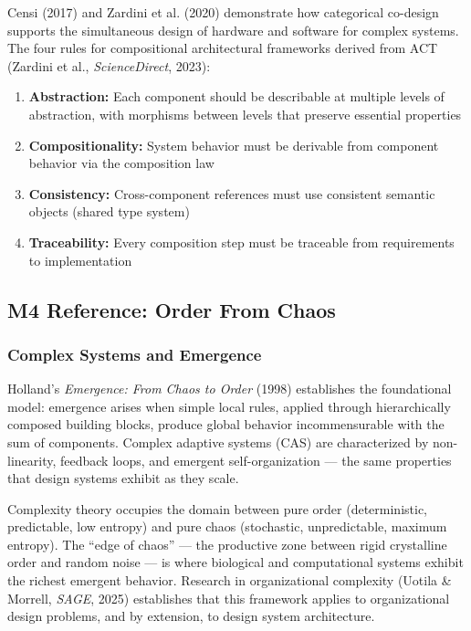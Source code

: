 \documentclass[11pt,letterpaper]{article}
\begin{document}
Censi (2017) and Zardini et al. (2020) demonstrate how categorical co-design supports the simultaneous design of hardware and software for complex systems. The four rules for compositional architectural frameworks derived from ACT (Zardini et al., \textit{ScienceDirect}, 2023):

\begin{enumerate}[leftmargin=2em, itemsep=0.3em]
  \item \textbf{Abstraction:} Each component should be describable at multiple levels of abstraction, with morphisms between levels that preserve essential properties
  \item \textbf{Compositionality:} System behavior must be derivable from component behavior via the composition law
  \item \textbf{Consistency:} Cross-component references must use consistent semantic objects (shared type system)
  \item \textbf{Traceability:} Every composition step must be traceable from requirements to implementation
\end{enumerate}

\subsection{M4 Reference: Order From Chaos}

\subsubsection{Complex Systems and Emergence}

Holland's \textit{Emergence: From Chaos to Order} (1998) establishes the foundational model: emergence arises when simple local rules, applied through hierarchically composed building blocks, produce global behavior incommensurable with the sum of components. Complex adaptive systems (CAS) are characterized by non-linearity, feedback loops, and emergent self-organization --- the same properties that design systems exhibit as they scale.

Complexity theory occupies the domain between pure order (deterministic, predictable, low entropy) and pure chaos (stochastic, unpredictable, maximum entropy). The ``edge of chaos'' --- the productive zone between rigid crystalline order and random noise --- is where biological and computational systems exhibit the richest emergent behavior. Research in organizational complexity (Uotila \& Morrell, \textit{SAGE}, 2025) establishes that this framework applies to organizational design problems, and by extension, to design system architecture.
\end{document}
